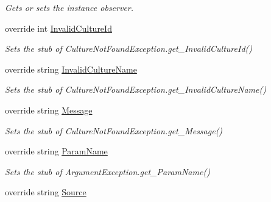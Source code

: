\begin{DoxyCompactItemize}
\begin{DoxyCompactList}\small\item\em Gets or sets the instance observer.\end{DoxyCompactList}\item 
override int \hyperlink{class_system_1_1_globalization_1_1_fakes_1_1_stub_culture_not_found_exception_a8256b91a83937b02f3ffcc374cd4f844}{Invalid\-Culture\-Id}
\begin{DoxyCompactList}\small\item\em Sets the stub of Culture\-Not\-Found\-Exception.\-get\-\_\-\-Invalid\-Culture\-Id()\end{DoxyCompactList}\item 
override string \hyperlink{class_system_1_1_globalization_1_1_fakes_1_1_stub_culture_not_found_exception_a9227cad16927c6b5457c8a732ebeb4a5}{Invalid\-Culture\-Name}
\begin{DoxyCompactList}\small\item\em Sets the stub of Culture\-Not\-Found\-Exception.\-get\-\_\-\-Invalid\-Culture\-Name()\end{DoxyCompactList}\item 
override string \hyperlink{class_system_1_1_globalization_1_1_fakes_1_1_stub_culture_not_found_exception_a524f3e3a5e045f57d91ad8cdb9cadf58}{Message}
\begin{DoxyCompactList}\small\item\em Sets the stub of Culture\-Not\-Found\-Exception.\-get\-\_\-\-Message()\end{DoxyCompactList}\item 
override string \hyperlink{class_system_1_1_globalization_1_1_fakes_1_1_stub_culture_not_found_exception_aa92dd07d0476271121bae1394399b2be}{Param\-Name}
\begin{DoxyCompactList}\small\item\em Sets the stub of Argument\-Exception.\-get\-\_\-\-Param\-Name()\end{DoxyCompactList}\item 
override string \hyperlink{class_system_1_1_globalization_1_1_fakes_1_1_stub_culture_not_found_exception_a42444ecc64dd6afe8d23655cd12aeb3f}{Source}

\end{DoxyCompactItemize}
